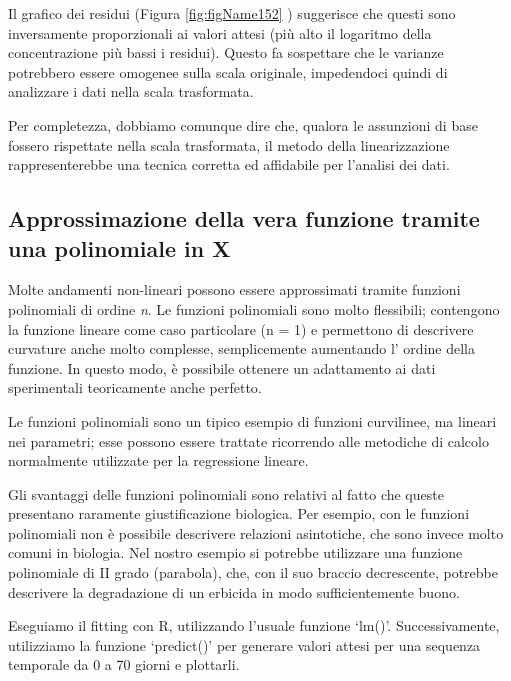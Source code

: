 \documentclass[a4paper,12pt,oneside]{book}
\begin{document}
Il grafico dei residui (Figura \ref{fig:figName152} ) suggerisce che questi sono inversamente proporzionali ai valori attesi (più alto il logaritmo della concentrazione più bassi i residui). Questo fa sospettare che le varianze potrebbero essere omogenee sulla scala originale, impedendoci quindi di analizzare i dati nella scala trasformata.

Per completezza, dobbiamo comunque dire che, qualora le assunzioni di base fossero rispettate nella scala trasformata, il metodo della linearizzazione rappresenterebbe una tecnica corretta ed affidabile per l'analisi dei dati.

\hypertarget{approssimazione-della-vera-funzione-tramite-una-polinomiale-in-x}{%
\subsection{Approssimazione della vera funzione tramite una polinomiale in X}\label{approssimazione-della-vera-funzione-tramite-una-polinomiale-in-x}}

Molte andamenti non-lineari possono essere approssimati tramite funzioni polinomiali di ordine \textit{n}. Le funzioni polinomiali sono molto flessibili; contengono la funzione lineare come caso particolare (n = 1) e permettono di descrivere curvature anche molto complesse, semplicemente aumentando l' ordine della funzione. In questo modo, è possibile ottenere un adattamento ai dati sperimentali teoricamente anche perfetto.

Le funzioni polinomiali sono un tipico esempio di funzioni curvilinee, ma lineari nei parametri; esse possono essere trattate ricorrendo alle metodiche di calcolo normalmente utilizzate per la regressione lineare.

Gli svantaggi delle funzioni polinomiali sono relativi al fatto che queste presentano raramente giustificazione biologica. Per esempio, con le funzioni polinomiali non è possibile descrivere relazioni asintotiche, che sono invece molto comuni in biologia. Nel nostro esempio si potrebbe utilizzare una funzione polinomiale di II grado (parabola), che, con il suo braccio decrescente, potrebbe descrivere la degradazione di un erbicida in modo sufficientemente buono.

Eseguiamo il fitting con R, utilizzando l'usuale funzione `lm()'. Successivamente, utilizziamo la funzione `predict()' per generare valori attesi per una sequenza temporale da 0 a 70 giorni e plottarli.
\end{document}
